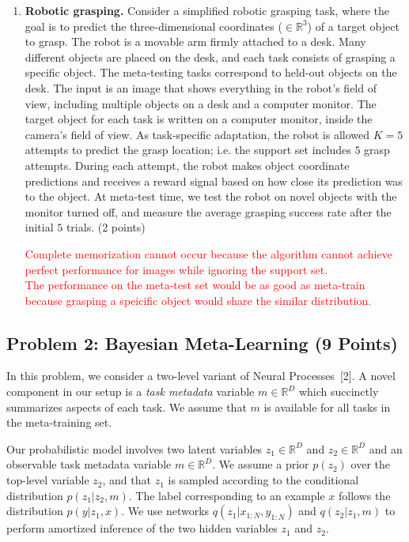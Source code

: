 \documentclass[12pt]{article}
\begin{document}
\begin{enumerate}[label=(\alph*)]
        \item \textbf{Robotic grasping.}
        Consider a simplified robotic grasping task, where the goal is to predict the three-dimensional coordinates ($\in \mathbb{R}^3$) of a target object to grasp.
        The robot is a movable arm firmly attached to a desk.
        Many different objects are placed on the desk, and each task consists of grasping a specific object. The meta-testing tasks correspond to held-out objects on the desk.
        The input is an image that shows everything in the robot's field of view, including multiple objects on a desk and a computer monitor.
        The target object for each task is written on a computer monitor, inside the camera's field of view.
        As task-specific adaptation, the robot is allowed $K=5$ attempts to predict the grasp location; i.e. the support set includes $5$ grasp attempts.
        During each attempt, the robot makes object coordinate predictions and receives a reward signal based on how close its prediction was to the object.
        At meta-test time, we test the robot on novel objects with the monitor turned off, and measure the average grasping success rate after the initial $5$ trials.
        (2 points)

        \textcolor{red}{Complete memorization cannot occur because the algorithm cannot achieve perfect performance for images while ignoring the support set.\\
        The performance on the meta-test set would be as good as meta-train because grasping a speicific object would share the similar distribution.}

    \end{enumerate}

    \subsection*{Problem 2: Bayesian Meta-Learning (9 Points)}
    In this problem, we consider a two-level variant of Neural Processes~[2].
    A novel component in our setup is a \textit{task metadata} variable $m \in \mathbb{R}^D$ which succinctly summarizes aspects of each task.
    We assume that $m$ is available for all tasks in the meta-training set.

    Our probabilistic model involves two latent variables $z_1 \in \mathbb{R}^D$ and $z_2 \in \mathbb{R}^D$ and an observable task metadata variable $m \in \mathbb{R}^D$.
    We assume a prior $p(z_2)$ over the top-level variable $z_2$, and that $z_1$ is sampled according to the conditional distribution $p(z_1 | z_2, m)$.
    The label corresponding to an example $x$ follows the distribution $p(y | z_1, x)$.
    We use networks $q(z_1 | x_{1:N}, y_{1:N})$ and $q(z_2 | z_1, m)$ to perform amortized inference of the two hidden variables $z_1$ and $z_2$.
\end{document}
